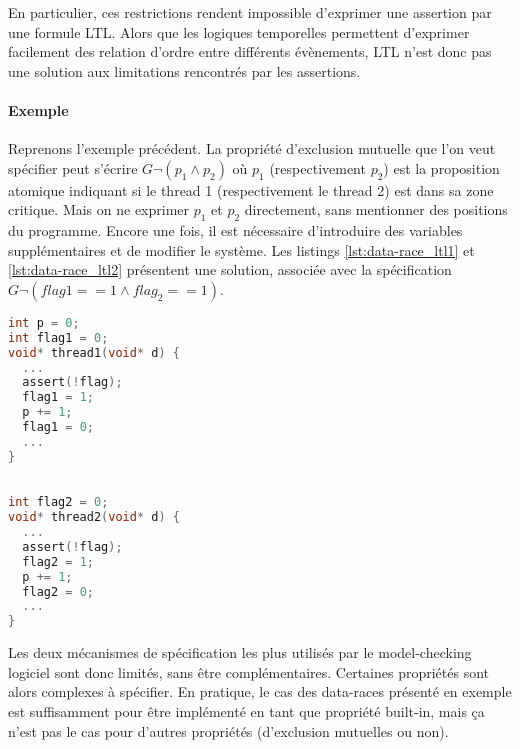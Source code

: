En particulier, ces restrictions rendent impossible d'exprimer une assertion par
une formule \ac{LTL}. Alors que les logiques temporelles permettent d'exprimer
facilement des relation d'ordre entre différents évènements, \ac{LTL} n'est donc
pas une solution aux limitations rencontrés par les assertions.

\paragraph{Exemple}
Reprenons l'exemple précédent. La propriété d'exclusion mutuelle que l'on veut
spécifier peut s'écrire \(G \lnot (p_1 \land p_2)\) où \(p_1\) (respectivement
\(p_2\)) est la proposition atomique indiquant si le thread 1 (respectivement le
thread 2) est dans sa zone critique. Mais on ne exprimer \(p_1\) et \(p_2\)
directement, sans mentionner des positions du programme. Encore une fois, il est
nécessaire d'introduire des variables supplémentaires et de modifier le système.
Les listings \ref{lst:data-race_ltl1} et \ref{lst:data-race_ltl2} présentent une
solution, associée avec la spécification \(G \lnot (flag1 == 1 \land flag_2 ==
1)\).

\noindent\begin{minipage}{.45\textwidth}
  \begin{lstlisting}[language=C, frame=single, caption=Thread 1,
    label=lst:data-race_ltl1]
int p = 0;
int flag1 = 0;
void* thread1(void* d) {
  ...
  assert(!flag);
  flag1 = 1;
  p += 1;
  flag1 = 0;
  ...
}
\end{lstlisting}
\end{minipage}\hfill
\begin{minipage}{.45\textwidth}
\begin{lstlisting}[language=C, frame=single, caption=Thread 2,
    label=lst:data-race_ltl2]

int flag2 = 0;
void* thread2(void* d) {
  ...
  assert(!flag);
  flag2 = 1;
  p += 1;
  flag2 = 0;
  ...
}
\end{lstlisting}
\end{minipage}

Les deux mécanismes de spécification les plus utilisés par le model-checking
logiciel sont donc limités, sans être complémentaires. Certaines propriétés sont
alors complexes à spécifier. En pratique, le cas des data-races présenté en
exemple est suffisamment pour être implémenté en tant que propriété built-in,
mais ça n'est pas le cas pour d'autres propriétés (d'exclusion mutuelles ou non).

